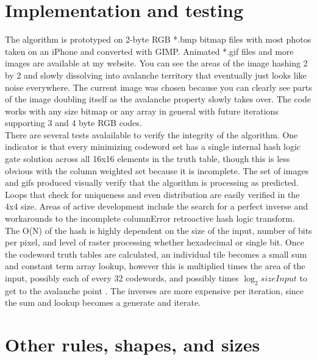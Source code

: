 \documentclass[11pt]{article}
\begin{document}
\section{Implementation and testing}

The algorithm is prototyped on 2-byte RGB *.bmp bitmap files with most photos taken on an iPhone and converted with GIMP. Animated *.gif files and more images are available at my website. You can see the areas of the image hashing 2 by 2 and slowly dissolving into avalanche territory that eventually just looks like noise everywhere. The current image was chosen because you can clearly see parts of the image doubling itself as the avalanche property slowly takes over. The code works with any size bitmap or any array in general with future iterations supporting 3 and 4 byte RGB codes. \\

There are several tests avalailable to verify the integrity of the algorithm. One indicator is that every minimizing codeword set has a single internal hash logic gate solution across all 16x16 elements in the truth table, though this is less obvious with the column weighted set because it is incomplete. The set of images and gifs produced visually verify that the algorithm is processing as predicted. Loops that check for uniqueness and even distribution are easily verified in the 4x4 size. Areas of active development include the search for a perfect inverse and workarounds to the incomplete columnError retroactive hash logic transform.\\

The O(N) of the hash is highly dependent on the size of the input, number of bits per pixel, and level of raster processing whether hexadecimal or single bit. Once the codeword truth tables are calculated, an individual tile becomes a small sum and constant term array lookup, however this is multiplied times the area of the input, possibly each of every 32 codewords, and possibly times $\log_2 sizeInput$ to get to the avalanche point . The inverses are more expensive per iteration, since the sum and lookup becomes a generate and iterate.\\



\section{Other rules, shapes, and sizes}
\end{document}
